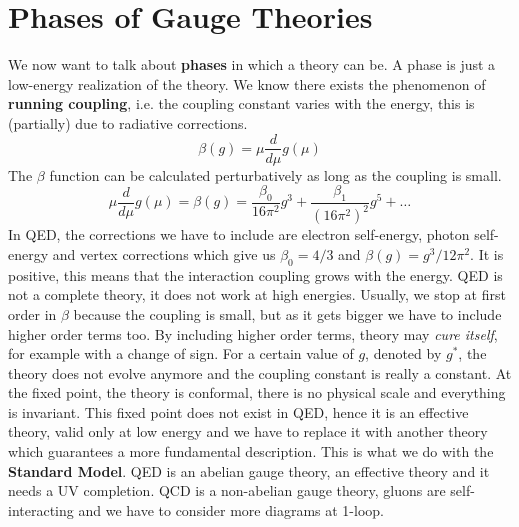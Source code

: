 \documentclass[../main.tex]{subfiles}
\begin{document}
\section{Phases of Gauge Theories}
We now want to talk about \textbf{phases} in which a theory can be. A phase is just a low-energy realization of the theory. We know there exists the phenomenon of \textbf{running coupling}, i.e. the coupling constant varies with the energy, this is (partially) due to radiative corrections.
\[
\beta(g)=\mu\frac{d}{d\mu}g(\mu)
\]
The $\beta$ function can be calculated perturbatively as long as the coupling is small.
\[
\mu\frac{d}{d\mu}g(\mu)=\beta(g)=\frac{\beta_0}{16\pi^2}g^3+\frac{\beta_1}{(16\pi^2)^2}g^5+\dots
\]
In QED, the corrections we have to include are electron self-energy, photon self-energy and vertex corrections which give us $\beta_0=4/3$ and $\beta(g)=g^3/12\pi^2$. 
It is positive, this means that the interaction coupling grows with the energy. QED is not a complete theory, it does not work at high energies. Usually, we stop at first order in $\beta$ because the coupling is small, but as it gets bigger we have to include higher order terms too. By including higher order terms, theory may \textit{cure itself}, for example with a change of sign. For a certain value of $g$, denoted by $g^*$, the theory does not evolve anymore and the coupling constant is really a constant. At the fixed point, the theory is conformal, there is no physical scale and everything is invariant. This fixed point does not exist in QED, hence it is an effective theory, valid only at low energy and we have to replace it with another theory which guarantees a more fundamental description. This is what we do with the \textbf{Standard Model}. QED is an abelian gauge theory, an effective theory and it needs a UV completion. QCD is a non-abelian gauge theory, gluons are self-interacting and we have to consider more diagrams at 1-loop.
\end{document}
